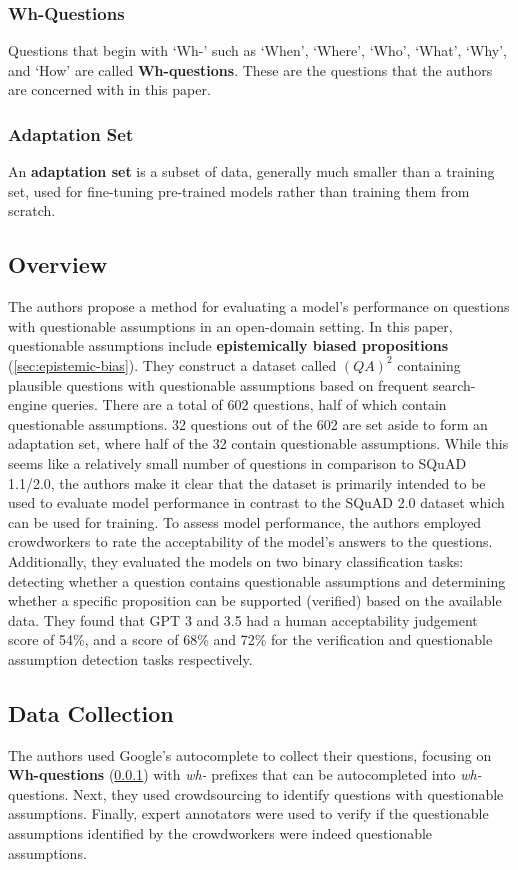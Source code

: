 \documentclass[letterpaper, 11pt]{article}
\begin{document}
\subsubsection{Wh-Questions}
\label{sec:wh-questions}
Questions that begin with `Wh-' such as `When', `Where', `Who', `What', `Why', and `How' are called \textbf{Wh-questions}. These are the questions that the authors are concerned with in this paper.

\subsubsection{Adaptation Set}
An \textbf{adaptation set} is a subset of data, generally much smaller than a training set, used for fine-tuning pre-trained models rather than training them from scratch.

\subsection{Overview}
The authors propose a method for evaluating a model's performance on questions with questionable assumptions in an open-domain setting. In this paper, questionable assumptions include 
\textbf{epistemically biased propositions} (\ref{sec:epistemic-bias}).
They construct a dataset called $(QA)^2$ containing plausible questions with questionable assumptions 
based on frequent search-engine queries. There are a total of 602 questions, half of which contain questionable assumptions. 32 questions out of the 602 are set aside to form an adaptation set, where half of the 32 contain questionable assumptions. 
While this seems like a relatively small number of questions in comparison to SQuAD 1.1/2.0, the authors make it clear that the dataset is primarily intended to be used to evaluate model performance in contrast to the SQuAD 2.0 dataset which can be used for training.
To assess model performance, the authors employed crowdworkers to rate the acceptability of the model's answers to the questions. Additionally, they evaluated the models on two binary classification tasks: detecting whether a question contains questionable assumptions and determining whether a specific proposition can be supported (verified) based on the available data.
They found that GPT 3 and 3.5 had a human acceptability judgement score of 54\%, and a score of 68\% and 72\% for the verification and questionable assumption detection tasks respectively.

\subsection{Data Collection}
The authors used Google's autocomplete to collect their questions, focusing on \textbf{Wh-questions} (\ref{sec:wh-questions}) with \textit{wh-} prefixes that can be autocompleted into \textit{wh-} questions.
Next, they used crowdsourcing to identify questions with questionable assumptions. Finally, expert annotators were used to verify if the questionable assumptions identified by the crowdworkers were indeed questionable assumptions.
\end{document}
